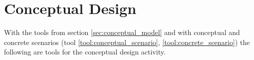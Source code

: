 \section{Conceptual Design} \label{sec:envisionment}
With the tools from section \ref{sec:conceptual_model} and with conceptual and concrete scenarios (tool \ref{tool:conceptual_scenario}, \ref{tool:concrete_scenario}) the following are tools for the conceptual design activity.







